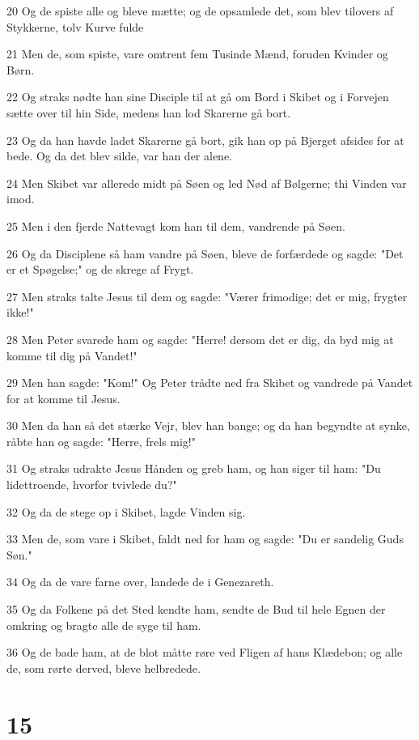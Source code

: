 \par 20 Og de spiste alle og bleve mætte; og de opsamlede det, som blev tilovers af Stykkerne, tolv Kurve fulde
\par 21 Men de, som spiste, vare omtrent fem Tusinde Mænd, foruden Kvinder og Børn.
\par 22 Og straks nødte han sine Disciple til at gå om Bord i Skibet og i Forvejen sætte over til hin Side, medens han lod Skarerne gå bort.
\par 23 Og da han havde ladet Skarerne gå bort, gik han op på Bjerget afsides for at bede. Og da det blev silde, var han der alene.
\par 24 Men Skibet var allerede midt på Søen og led Nød af Bølgerne; thi Vinden var imod.
\par 25 Men i den fjerde Nattevagt kom han til dem, vandrende på Søen.
\par 26 Og da Disciplene så ham vandre på Søen, bleve de forfærdede og sagde: "Det er et Spøgelse;" og de skrege af Frygt.
\par 27 Men straks talte Jesus til dem og sagde: "Værer frimodige; det er mig, frygter ikke!"
\par 28 Men Peter svarede ham og sagde: "Herre! dersom det er dig, da byd mig at komme til dig på Vandet!"
\par 29 Men han sagde: "Kom!" Og Peter trådte ned fra Skibet og vandrede på Vandet for at komme til Jesus.
\par 30 Men da han så det stærke Vejr, blev han bange; og da han begyndte at synke, råbte han og sagde: "Herre, frels mig!"
\par 31 Og straks udrakte Jesus Hånden og greb ham, og han siger til ham: "Du lidettroende, hvorfor tvivlede du?"
\par 32 Og da de stege op i Skibet, lagde Vinden sig.
\par 33 Men de, som vare i Skibet, faldt ned for ham og sagde: "Du er sandelig Guds Søn."
\par 34 Og da de vare farne over, landede de i Genezareth.
\par 35 Og da Folkene på det Sted kendte ham, sendte de Bud til hele Egnen der omkring og bragte alle de syge til ham.
\par 36 Og de bade ham, at de blot måtte røre ved Fligen af hans Klædebon; og alle de, som rørte derved, bleve helbredede.

\chapter{15}

